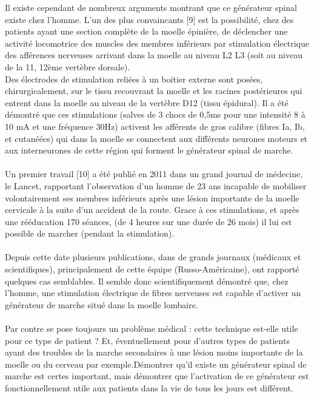 \documentclass{report}
\begin{document}
Il existe cependant de nombreux arguments montrant que ce g\'{e}n\'{e}rateur spinal existe chez
l'homme. L'un des plus convaincants [9] est la possibilit\'{e}, chez des patients ayant une
section compl\`{e}te de la moelle \'{e}pini\`{e}re, de d\'{e}clencher une activit\'{e} locomotrice des muscles
des membres inf\'{e}rieurs par stimulation \'{e}lectrique des aff\'{e}rences nerveuses arrivant dans la
moelle au niveau L2 L3 (soit au niveau de la 11, 12\`{e}me vert\`{e}bre dorsale).\\
Des \'{e}lectrodes de stimulation reli\'{e}es \`{a} un boitier externe sont pos\'{e}es, chirurgicalement, sur
le tissu recouvrant la moelle et les racines post\'{e}rieures qui entrent dans la moelle au niveau
de la vert\`{e}bre D12 (tissu \'{e}pidural). Il a \'{e}t\'{e} d\'{e}montr\'{e} que ces stimulations (salves de 3 chocs
de 0,5ms pour une intensit\'{e} 8 \`{a} 10 mA et une fr\'{e}quence 30Hz) activent les aff\'{e}rents de gros
calibre (fibres Ia, Ib, et cutan\'{e}\'{e}es) qui dans la moelle se connectent aux diff\'{e}rents neurones
moteurs et aux interneurones de cette r\'{e}gion qui forment le g\'{e}n\'{e}rateur spinal de marche.\\ \\

Un premier travail [10] a \'{e}t\'{e} publi\'{e} en 2011 dans un grand journal de m\'{e}decine, le Lancet,
rapportant l'observation d'un homme de 23 ans incapable de mobiliser volontairement ses
membres inf\'{e}rieurs apr\`{e}s une l\'{e}sion importante de la moelle cervicale \`{a} la suite d'un
accident de la route. Grace \`{a} ces stimulations, et apr\`{e}s une r\'{e}\'{e}ducation 170 s\'{e}ances, (de 4
heures sur une dur\'{e}e de 26 mois) il lui est possible de marcher (pendant la stimulation).\\ \\

Depuis cette date plusieurs publications, dans de grands journaux (m\'{e}dicaux et
scientifiques), principalement de cette \'{e}quipe (Russo-Am\'{e}ricaine), ont rapport\'{e} quelques
cas semblables. Il semble donc scientifiquement d\'{e}montr\'{e} que, chez l'homme, une
stimulation \'{e}lectrique de fibres nerveuses est capable d'activer un g\'{e}n\'{e}rateur de marche
situ\'{e} dans la moelle lombaire.\\ \\

Par contre se pose toujours un probl\`{e}me m\'{e}dical : cette technique est-elle utile pour ce type
de patient ? Et, \'{e}ventuellement pour d'autres types de patients ayant des troubles de la
marche secondaires \`{a} une l\'{e}sion moins importante de la moelle ou du cerveau par exemple.D\'{e}montrer qu'il existe un g\'{e}n\'{e}rateur spinal de marche est certes important, mais d\'{e}montrer
que l'activation de ce g\'{e}n\'{e}rateur est fonctionnellement utile aux patients dans la vie de tous
les jours est diff\'{e}rent. \\
\end{document}

